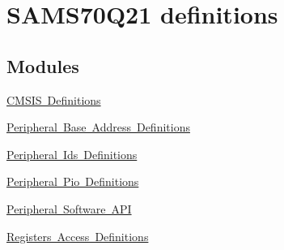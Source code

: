 \hypertarget{group__SAMS70Q21__definitions}{}\section{S\+A\+M\+S70\+Q21 definitions}
\label{group__SAMS70Q21__definitions}
\subsection*{Modules}
\begin{DoxyCompactItemize}
\item 
\mbox{\hyperlink{group__SAMS70Q21__cmsis}{C\+M\+S\+I\+S Definitions}}
\item 
\mbox{\hyperlink{group__SAMS70Q21__base}{Peripheral Base Address Definitions}}
\item 
\mbox{\hyperlink{group__SAMS70Q21__id}{Peripheral Ids Definitions}}
\item 
\mbox{\hyperlink{group__SAMS70Q21__pio}{Peripheral Pio Definitions}}
\item 
\mbox{\hyperlink{group__SAMS70Q21__api}{Peripheral Software A\+PI}}
\item 
\mbox{\hyperlink{group__SAMS70Q21__reg}{Registers Access Definitions}}
\end{DoxyCompactItemize}
